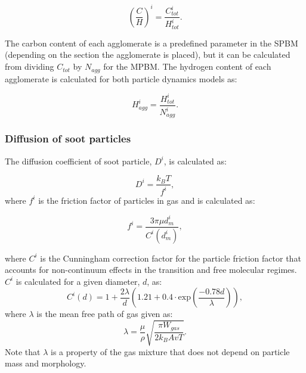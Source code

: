 \begin{equation}
	\left(
	\frac{C}{H}
	\right)^i
	=\frac{C^i_{tot}}{H^i_{tot}}   
	\label{eqn:CtoH}.
\end{equation}

The carbon content of each agglomerate is a predefined parameter in the SPBM (depending on the section the agglomerate is placed), but it can be calculated from dividing ${C_{tot}}$ by ${N_{agg}}$ for the MPBM. The hydrogen content of each agglomerate is calculated for both particle dynamics models as:

\begin{equation}
	H^i_{agg}
	=\frac{H^i_{tot}}{N^i_{agg}}   
	\label{eqn:Hagg}.
\end{equation}


\subsubsection{Diffusion of soot particles}
The diffusion coefficient of soot particle, $D^i$, is calculated as:

\begin{equation}
	D^i = \frac{k_B T}{f^i}
	\label{eqn:diff},
\end{equation}
\noindent where $f^i$ is the friction factor of particles in gas and is calculated as:

\begin{equation}
	f^i = \frac{3\pi\mu d^i_m}{C^i(d^i_m)},
	\label{eqn:fraction}
\end{equation}

\noindent where ${C^i}$ is the Cunningham correction factor for the particle friction factor that accounts for non-continuum effects in the transition and free molecular regimes. ${C^i}$ is calculated for a given diameter, $d$, as: 
\begin{equation}
	C^i(d) = 1+\frac{2\lambda}{d}
	\left(
	1.21+0.4\cdot\mathrm{exp}(\frac{-0.78d}{\lambda})
	\right)
	\label{eqn:cun},
\end{equation}
\noindent  where $\lambda$ is the mean free path of gas given as:
\begin{equation}
	\lambda = \frac{\mu}{\rho}\sqrt{\frac{\pi W_{gas}}{2k_B Av T}}
	\label{eqn:lambda}.
\end{equation}
Note that $\lambda$ is a property of the gas mixture that does not depend on particle mass and morphology. 


